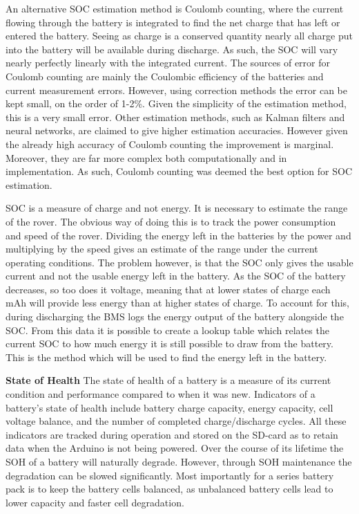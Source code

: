 \documentclass[a4paper]{article}
\begin{document}
An alternative SOC estimation method is Coulomb counting, where the current 
flowing through the battery is integrated to find the net charge that has 
left or entered the battery. Seeing as charge is a conserved quantity nearly 
all charge put into the battery will be available during discharge. As such, 
the SOC will vary nearly perfectly linearly with the integrated current. 
The sources of error for Coulomb counting are mainly the Coulombic efficiency 
of the batteries and current measurement errors. However, using correction 
methods the error can be kept small, on the order of 1-2\%\cite{NG20091506}. Given the 
simplicity of the estimation method, this is a very small error. Other 
estimation methods, such as Kalman filters and neural networks, are claimed 
to give higher estimation accuracies\cite{DANKO2019186}. However given the already high 
accuracy of Coulomb counting the improvement is marginal. Moreover, they 
are far more complex both computationally and in implementation. As such, 
Coulomb counting was deemed the best option for SOC estimation.

SOC is a measure of charge and not energy. It is necessary to estimate 
the range of the rover. The obvious way of doing this is to track the 
power consumption and speed of the rover. Dividing the energy left in 
the batteries by the power and multiplying by the speed gives an estimate 
of the range under the current operating conditions. The problem however, 
is that the SOC only gives the usable current and not the usable energy 
left in the battery. As the SOC of the battery decreases, so too does it 
voltage, meaning that at lower states of charge each mAh will provide less 
energy than at higher states of charge. To account for this, during discharging 
the BMS logs the energy output of the battery alongside the SOC. From this data 
it is possible to create a lookup table which relates the current SOC to how 
much energy it is still possible to draw from the battery. This is the method 
which will be used to find the energy left in the battery. 

\textbf{State of Health}
\vspace{10pt} 
\newline
The state of health of a battery is a measure of its current condition and 
performance compared to when it was new\cite{mpower}. Indicators of a battery’s state 
of health include battery charge capacity, energy capacity, cell voltage 
balance, and the number of completed charge/discharge cycles\cite{https://doi.org/10.1002/er.3598}. All these 
indicators are tracked during operation and stored on the SD-card as to 
retain data when the Arduino is not being powered. Over the course of its 
lifetime the SOH of a battery will naturally degrade. However, through SOH 
maintenance the degradation can be slowed significantly. Most importantly 
for a series battery pack is to keep the battery cells balanced, as 
unbalanced battery cells lead to lower capacity and faster cell degradation\cite{texas}. 
\end{document}
